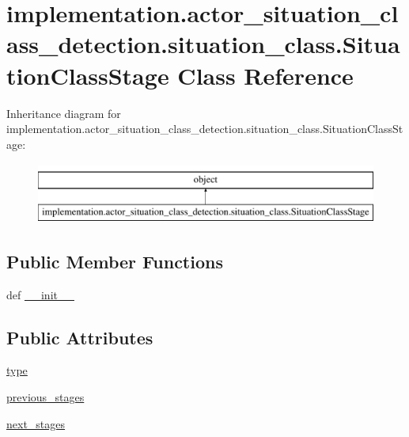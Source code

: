 \hypertarget{classimplementation_1_1actor__situation__class__detection_1_1situation__class_1_1_situation_class_stage}{}\section{implementation.\+actor\+\_\+situation\+\_\+class\+\_\+detection.\+situation\+\_\+class.\+Situation\+Class\+Stage Class Reference}
\label{classimplementation_1_1actor__situation__class__detection_1_1situation__class_1_1_situation_class_stage}
Inheritance diagram for implementation.\+actor\+\_\+situation\+\_\+class\+\_\+detection.\+situation\+\_\+class.\+Situation\+Class\+Stage\+:\begin{figure}[H]
\begin{center}
\leavevmode
\includegraphics[height=2.000000cm]{classimplementation_1_1actor__situation__class__detection_1_1situation__class_1_1_situation_class_stage}
\end{center}
\end{figure}
\subsection*{Public Member Functions}
\begin{DoxyCompactItemize}
\item 
def \hyperlink{classimplementation_1_1actor__situation__class__detection_1_1situation__class_1_1_situation_class_stage_ae53e75b84a6e0effdb39425932de05f9}{\+\_\+\+\_\+init\+\_\+\+\_\+}
\end{DoxyCompactItemize}
\subsection*{Public Attributes}
\begin{DoxyCompactItemize}
\item 
\hyperlink{classimplementation_1_1actor__situation__class__detection_1_1situation__class_1_1_situation_class_stage_a2739ff793de57b513621a5bba3ced6eb}{type}
\item 
\hyperlink{classimplementation_1_1actor__situation__class__detection_1_1situation__class_1_1_situation_class_stage_a0cff48353fee8813eb25d53337f851b3}{previous\+\_\+stages}
\item 
\hyperlink{classimplementation_1_1actor__situation__class__detection_1_1situation__class_1_1_situation_class_stage_af5f9b64b63ea973eccea97393dc33f3c}{next\+\_\+stages}
\end{DoxyCompactItemize}


